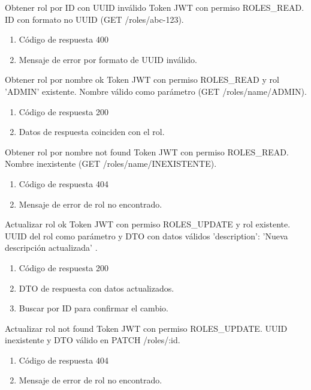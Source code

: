 {Obtener rol por ID con UUID inválido}
{Token JWT con permiso ROLES\_READ.}
{ID con formato no UUID (GET /roles/abc-123).}
{\begin{enumerate} [leftmargin=*, nosep]
    \item Código de respuesta 400
    \item Mensaje de error por formato de UUID inválido.
\end{enumerate}}

{Obtener rol por nombre ok}
{Token JWT con permiso ROLES\_READ y rol 'ADMIN' existente.}
{Nombre válido como parámetro (GET /roles/name/ADMIN).}
{\begin{enumerate} [leftmargin=*, nosep]
    \item Código de respuesta 200
    \item Datos de respuesta coinciden con el rol.
\end{enumerate}}

{Obtener rol por nombre not found}
{Token JWT con permiso ROLES\_READ.}
{Nombre inexistente (GET /roles/name/INEXISTENTE).}
{\begin{enumerate} [leftmargin=*, nosep]
    \item Código de respuesta 404
    \item Mensaje de error de rol no encontrado.
\end{enumerate}}

{Actualizar rol ok}
{Token JWT con permiso ROLES\_UPDATE y rol existente.}
{UUID del rol como parámetro y DTO con datos válidos { 'description': 'Nueva descripción actualizada' }.}
{\begin{enumerate} [leftmargin=*, nosep]
    \item Código de respuesta 200
    \item DTO de respuesta con datos actualizados.
    \item Buscar por ID para confirmar el cambio.
\end{enumerate}}

{Actualizar rol not found}
{Token JWT con permiso ROLES\_UPDATE.}
{UUID inexistente y DTO válido en PATCH /roles/:id.}
{\begin{enumerate} [leftmargin=*, nosep]
    \item Código de respuesta 404
    \item Mensaje de error de rol no encontrado.
\end{enumerate}}

